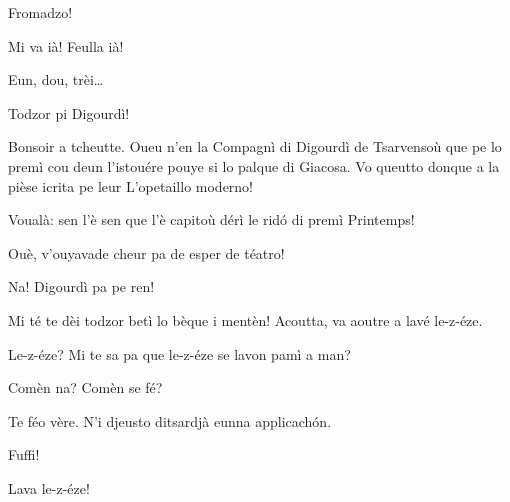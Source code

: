 \begin{drama}

\Fotografespeaks{} Fromadzo!

\Tcheuttespeaks {} Mi va ià! Feulla ià!


\Joelspeaks Eun, dou, trèi\ldots

\Tcheuttespeaks{} Todzor pi Digourdì!



\Joelspeaks Bonsoir a tcheutte. Oueu n'en la Compagnì di Digourdì de Tsarvensoù que pe lo premì cou deun l'istouére pouye si lo palque di Giacosa. Vo queutto donque a la pièse icrita pe leur \og L'opetaillo moderno\fg{}!



\Maganspeaks Voualà: sen l'è sen que l'è capitoù dérì le rid\'o di premì Printemps!

\Nevaouspeaks{} Ouè, v'ouyavade cheur pa de esper de téatro!

\Maganspeaks Na! Digourdì pa pe ren!

\Paganspeaks{}  Mi té te dèi todzor betì lo bèque i mentèn! Acoutta, va aoutre a lavé le-z-éze.

\Maganspeaks Le-z-éze? Mi te sa pa que le-z-éze se lavon pamì a man?

\Paganspeaks Comèn na? Comèn se fé?

\Maganspeaks Te féo vère.  N'i djeusto ditsardjà eunna applicach\'on.


\Maganspeaks{} Fuffi!


\Maganspeaks{} Lava le-z-éze!



\end{drama}
